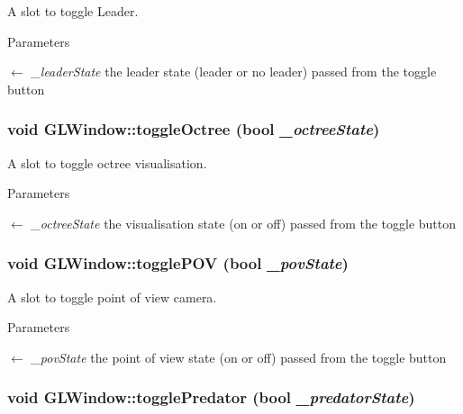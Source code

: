 A slot to toggle Leader. 
\begin{DoxyParams}{Parameters}
\item[\mbox{$\leftarrow$} {\em \_\-leaderState}]the leader state (leader or no leader) passed from the toggle button \end{DoxyParams}
\hypertarget{classGLWindow_aec80ba5f39a1ec536c07f092b070917e}{
\subsubsection[{toggleOctree}]{\setlength{\rightskip}{0pt plus 5cm}void GLWindow::toggleOctree (bool {\em \_\-octreeState})}}
\label{classGLWindow_aec80ba5f39a1ec536c07f092b070917e}


A slot to toggle octree visualisation. 
\begin{DoxyParams}{Parameters}
\item[\mbox{$\leftarrow$} {\em \_\-octreeState}]the visualisation state (on or off) passed from the toggle button \end{DoxyParams}
\hypertarget{classGLWindow_a46e729b49bf86b01acb2d9f00e992195}{
\subsubsection[{togglePOV}]{\setlength{\rightskip}{0pt plus 5cm}void GLWindow::togglePOV (bool {\em \_\-povState})}}
\label{classGLWindow_a46e729b49bf86b01acb2d9f00e992195}


A slot to toggle point of view camera. 
\begin{DoxyParams}{Parameters}
\item[\mbox{$\leftarrow$} {\em \_\-povState}]the point of view state (on or off) passed from the toggle button \end{DoxyParams}
\hypertarget{classGLWindow_abdb002d0a22ee91d2d8d9f2f35d00103}{
\subsubsection[{togglePredator}]{\setlength{\rightskip}{0pt plus 5cm}void GLWindow::togglePredator (bool {\em \_\-predatorState})}}
\label{classGLWindow_abdb002d0a22ee91d2d8d9f2f35d00103}


